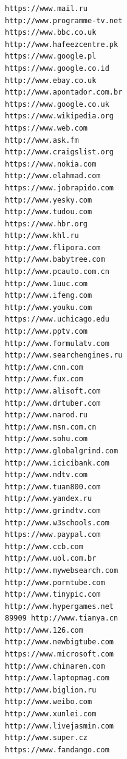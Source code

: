 \documentclass[10pt,letterpaper,notitlepage]{article}
\begin{document}
\begin{multicols}{4}
\begin{verbatim}
https://www.mail.ru
http://www.programme-tv.net
https://www.bbc.co.uk
http://www.hafeezcentre.pk
https://www.google.pl
https://www.google.co.id
http://www.ebay.co.uk
http://www.apontador.com.br
https://www.google.co.uk
https://www.wikipedia.org
https://www.web.com
http://www.ask.fm
http://www.craigslist.org
https://www.nokia.com
http://www.elahmad.com
https://www.jobrapido.com
http://www.yesky.com
http://www.tudou.com
https://www.hbr.org
http://www.khl.ru
http://www.flipora.com
http://www.babytree.com
http://www.pcauto.com.cn
http://www.1uuc.com
http://www.ifeng.com
http://www.youku.com
https://www.uchicago.edu
http://www.pptv.com
http://www.formulatv.com
http://www.searchengines.ru
http://www.cnn.com
http://www.fux.com
http://www.alisoft.com
http://www.drtuber.com
http://www.narod.ru
http://www.msn.com.cn
http://www.sohu.com
http://www.globalgrind.com
http://www.icicibank.com
http://www.ndtv.com
http://www.tuan800.com
http://www.yandex.ru
http://www.grindtv.com
http://www.w3schools.com
https://www.paypal.com
http://www.ccb.com
http://www.uol.com.br
http://www.mywebsearch.com
http://www.porntube.com
http://www.tinypic.com
http://www.hypergames.net
89909 http://www.tianya.cn
http://www.126.com
http://www.newbigtube.com
https://www.microsoft.com
http://www.chinaren.com
http://www.laptopmag.com
http://www.biglion.ru
http://www.weibo.com
http://www.xunlei.com
http://www.livejasmin.com
http://www.super.cz
https://www.fandango.com
\end{verbatim}
\end{multicols}
\end{document}

